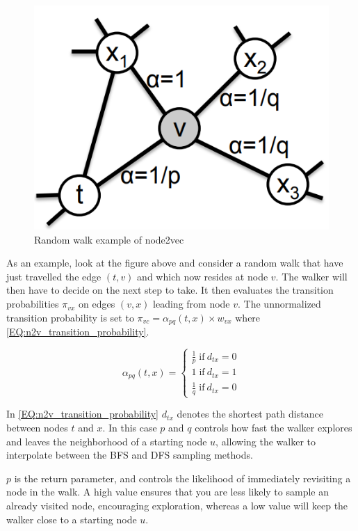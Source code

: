 \begin{figure}[H]
\centering
  \includegraphics[scale=0.5]{Article/figures/randomwalkexample.png}
  \caption{Random walk example of node2vec \cite{Node2vec}}
  \label{fig:n2v_randomwalk}
\end{figure}

As an example, look at the figure above and consider a random walk that have just travelled the edge $(t, v)$ and which now resides at node $v$. The walker will then have to decide on the next step to take. It then evaluates the transition probabilities $\pi_{vx}$ on edges $(v,x)$ leading from node $v$. The unnormalized transition probability is set to $\pi_{vc} = \alpha_{pq} (t,x) \times w_{vx}$ where \autoref{EQ:n2v_transition_probability}.

\begin{equation}\label{EQ:n2v_transition_probability}
\alpha_{pq} (t,x) =
\begin{cases} 
	\frac{1}{p} \; \text{if} \:  d_{tx} = 0 \\
	1 \; \text{if} \: d_{tx} = 1 \\
	\frac{1}{q} \; \text{if} \: d_{tx} = 0
\end{cases}
\end{equation}

In \autoref{EQ:n2v_transition_probability} $d_{tx}$ denotes the shortest path distance between nodes $t$ and $x$. In this case $p$ and $q$ controls how fast the walker explores and leaves the neighborhood of a starting node $u$, allowing the walker to interpolate between the BFS and DFS sampling methods.

$p$ is the return parameter, and controls the likelihood of immediately revisiting a node in the walk. A high value ensures that you are less likely to sample an already visited node, encouraging exploration, whereas a low value will keep the walker close to a starting node $u$.

